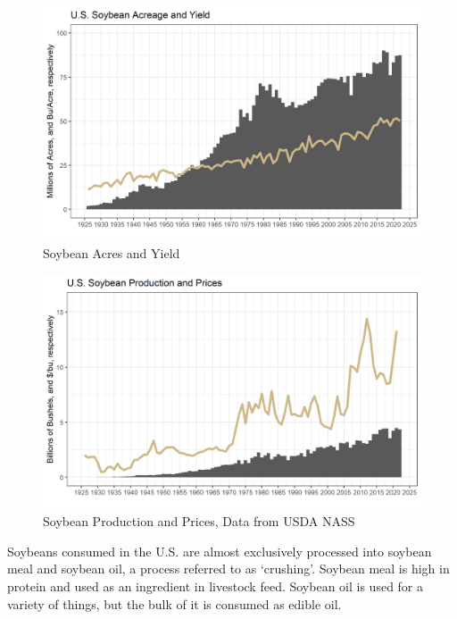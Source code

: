 \documentclass[
  letterpaper,
  DIV=11,
  numbers=noendperiod]{scrreprt}
\begin{document}
\begin{figure}[H]

{\centering \includegraphics{assets/PrimerforGrain_SoyAcandY.png}

}

\caption{Soybean Acres and Yield}

\end{figure}%
\begin{figure}[H]

{\centering \includegraphics{assets/PrimerforGrain_SoyProdand$.png}

}

\caption{Soybean Production and Prices, Data from USDA NASS}

\end{figure}%

Soybeans consumed in the U.S. are almost exclusively processed into
soybean meal and soybean oil, a process referred to as `crushing'.
Soybean meal is high in protein and used as an ingredient in livestock
feed. Soybean oil is used for a variety of things, but the bulk of it is
consumed as edible oil.
\end{document}
